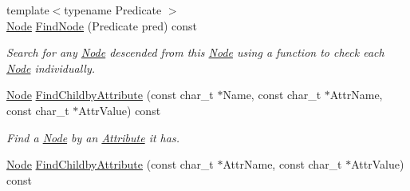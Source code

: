 \begin{DoxyCompactItemize}
{\footnotesize template$<$typename Predicate $>$ }\\\hyperlink{classphys_1_1xml_1_1Node}{Node} \hyperlink{classphys_1_1xml_1_1Node_a495663e5af0745f42e48bbfd21408c99}{FindNode} (Predicate pred) const 
\begin{DoxyCompactList}\small\item\em Search for any \hyperlink{classphys_1_1xml_1_1Node}{Node} descended from this \hyperlink{classphys_1_1xml_1_1Node}{Node} using a function to check each \hyperlink{classphys_1_1xml_1_1Node}{Node} individually. \item\end{DoxyCompactList}\item 
\hyperlink{classphys_1_1xml_1_1Node}{Node} \hyperlink{classphys_1_1xml_1_1Node_a8a362455b50e54454f145f9109a85e49}{FindChildbyAttribute} (const char\_\-t $\ast$Name, const char\_\-t $\ast$AttrName, const char\_\-t $\ast$AttrValue) const 
\begin{DoxyCompactList}\small\item\em Find a \hyperlink{classphys_1_1xml_1_1Node}{Node} by an \hyperlink{classphys_1_1xml_1_1Attribute}{Attribute} it has. \item\end{DoxyCompactList}\item 
\hypertarget{classphys_1_1xml_1_1Node_af6f0c0656e2a5cc7c79e032236b2b3b1}{
\hyperlink{classphys_1_1xml_1_1Node}{Node} \hyperlink{classphys_1_1xml_1_1Node_af6f0c0656e2a5cc7c79e032236b2b3b1}{FindChildbyAttribute} (const char\_\-t $\ast$AttrName, const char\_\-t $\ast$AttrValue) const }
\label{d7/d0a/classphys_1_1xml_1_1Node_af6f0c0656e2a5cc7c79e032236b2b3b1}


\end{DoxyCompactItemize}
